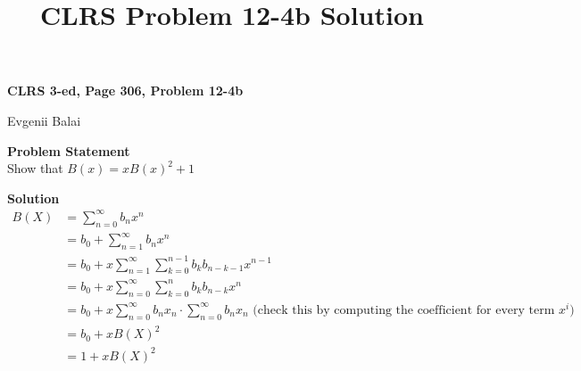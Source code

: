 \documentclass[letterpaper, 11pt]{article}
\title{CLRS Problem  12-4b Solution}
\begin{document}

\begin{center}
\Large \bf CLRS 3-ed, Page 306, Problem 12-4b

\large Evgenii Balai
\end{center}

\textbf{Problem Statement}\\
Show that  $B(x) =x B(x) ^2 +1$

\bigskip

\textbf{Solution}\\
\begin{align*}
B(X) &= \displaystyle\sum_{n=0}^{\infty}b_{n}x^n\\
     &=b_0 + \displaystyle\sum_{n=1}^{\infty}b_{n}x^n\\
     &=b_0+x\displaystyle\sum_{n=1}^{\infty}\displaystyle\sum_{k=0}^{n-1}b_kb_{n-k-1}x^{n-1}\\
     &=b_0+x\displaystyle\sum_{n=0}^{\infty}\displaystyle\sum_{k=0}^{n}b_kb_{n-k}x^{n}\\ 
     &=b_0+x\displaystyle\sum_{n=0}^{\infty}b_nx_n \cdot \sum_{n=0}^{\infty}b_nx_n \mbox{~(check this by computing the coefficient for every term $x^i$)}\\
     &=b_0 +x B(X)^2\\
     &=1 + xB(X)^2\\
\end{align*}





\clearpage

\end{document}
